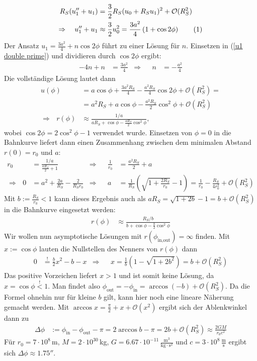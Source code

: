\documentclass[a4paper,12pt]{article}
\newcommand\numberthis{\addtocounter{equation}{1}\tag{\theequation}}
\newcommand{\kla}{}
\newcommand{\tecxt}{}
\begin{document}
\begin{align*}
R_S(u_1''+u_1)&=\frac{3}{2}R_S(u_0+R_Su_1)^2+\mathcal{O}(R_S^2)\\
\Rightarrow\ \ \ u_1''+u_1&\approx\frac{3}{2}u_0^2=\frac{3a^2}{4}\kla\left( {1+\cos 2\phi} \right)\numberthis\label{u1 double prime}
\end{align*}
Der Ansatz $u_1=\frac{3a^2}{4}+n\cos 2\phi $ führt zu einer Lösung für $n$. Einsetzen in (\ref{u1 double prime}) und dividieren durch $\cos 2\phi$ ergibt:
\begin{align*}
-4n+n&=\frac{3a^2}{4}&\Rightarrow &&n&=-\frac{a^2}{4}
\end{align*}
Die vollständige Lösung lautet dann
\begin{align*}
u(\phi)&= a\cos \phi+\frac{3a^2R_S}{4}-\frac{a^2R_S}{4}\cos 2\phi +\mathcal{O}(R_S^2)=\\
&= a^2R_S+a\cos \phi-\frac{a^2R_S}{2}\cos^2\phi+\mathcal{O}(R_S^2)\\
\Rightarrow\ \ \ r(\phi)&\approx\frac{1/a}{aR_S+\cos \phi-\frac{aR_S}{2}\cos^2\phi},
\end{align*}
wobei $\cos 2\phi=2\cos^2\phi -1$ verwendet wurde. Einsetzen von $\phi=0$ in die Bahnkurve liefert dann einen Zusammenhang zwischen dem minimalen Abstand $r(0)=r_0$ und $a$:
\begin{align*}
r_0&=\frac{1/a}{\frac{aR_S}{2}+1}&\Rightarrow &&\frac{1}{r_0}&=\frac{a^2R_S}{2}+a\\
\Rightarrow\ \ \ 0&=a^2+\frac{2a}{R_S}-\frac{2}{R_Sr_0}&\Rightarrow &&a&=\frac{1}{R_S}\kla\left( {\sqrt{1+\frac{2R_S}{r_0}}-1} \right)=\frac{1}{r_0}-\frac{R_S}{4r_0^2}+\mathcal{O}(R_S^2)
\end{align*} 
Mit $b:=\frac{R_S}{r_0}<1$ kann dieses Ergebnis auch als $aR_S=\sqrt{1+2b}-1= b+\mathcal{O}(R_S^2)$ in die Bahnkurve eingesetzt werden:
\begin{align*}
r(\phi)&\approx\frac{R_S/b}{b+\cos\phi -\frac{b}{2}\cos^2\phi}
\end{align*}
Wir wollen nun asymptotische Lösungen mit $r(\phi_{\tecxt\text{in},\tecxt\text{out}})=\infty$ finden. Mit $x:=\cos\phi$ lauten die Nullstellen des Nenners von $r(\phi)$ dann
\begin{align*}
0&\overset{!}{=} \frac{b}{2} x^2-b-x&\Rightarrow && x=\frac{1}{b}\kla\left( {1-\sqrt{1+2b^2}} \right)=b+\mathcal{O}(R_S^2)
\end{align*}
Das positive Vorzeichen liefert $x>1$ und ist somit keine Lösung, da $x=\cos\phi\overset{!}{<}1$. Man findet also $\phi_\tecxt\text{out}=-\phi_\tecxt\text{in}=\arccos (-b)+\mathcal{O}(R_S^2)$. Da die Formel ohnehin nur für kleine $b$ gilt, kann hier noch eine lineare Näherung gemacht werden. Mit $\arccos x=\frac{\pi}{2}+x+\mathcal{O}(x^2)$ ergibt sich der Ablenkwinkel dann zu
\begin{align*}
\Delta\phi &:=\phi_\tecxt\text{in}-\phi_\tecxt\text{out}-\pi=2\arccos b-\pi =2b+\mathcal{O}(R_S^2)\approx\frac{2GM}{r_0c^2}
\end{align*}
Für $r_0=7\cdot 10^8\,$m, $M=2\cdot 10^{30}\,$kg, $G=6.67\cdot 10^{-11}\,\frac{\tecxt\text{m}^3}{\tecxt\text{kg}\cdot\tecxt\text{s}^2}$ und $c=3\cdot 10^8\,\frac{\tecxt\text{m}}{\tecxt\text{s}}$ ergibt sich $\Delta\phi\approx 1.75''$.
\end{document}
